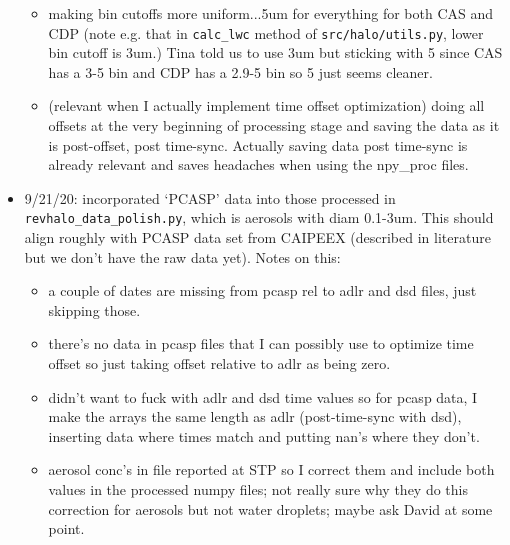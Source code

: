 \documentclass{article}
\begin{document}
\begin{itemize}
	\begin{itemize}
		\item making bin cutoffs more uniform...5um for everything for both CAS and CDP (note e.g. that in \texttt{calc\_lwc} method of \texttt{src/halo/utils.py}, lower bin cutoff is 3um.) Tina told us to use 3um but sticking with 5 since CAS has a 3-5 bin and CDP has a 2.9-5 bin so 5 just seems cleaner.
		\item (relevant when I actually implement time offset optimization) doing all offsets at the very beginning of processing stage and saving the data as it is post-offset, post time-sync. Actually saving data post time-sync is already relevant and saves headaches when using the npy\_proc files. 
	\end{itemize}
	\item 9/21/20: incorporated `PCASP' data into those processed in \texttt{revhalo\_data\_polish.py}, which is aerosols with diam 0.1-3um. This should align roughly with PCASP data set from CAIPEEX (described in literature but we don't have the raw data yet). Notes on this:
	\begin{itemize}
		\item a couple of dates are missing from pcasp rel to adlr and dsd files, just skipping those.
		\item there's no data in pcasp files that I can possibly use to optimize time offset so just taking offset relative to adlr as being zero. 
		\item didn't want to fuck with adlr and dsd time values so for pcasp data, I make the arrays the same length as adlr (post-time-sync with dsd), inserting data where times match and putting nan's where they don't.
		\item aerosol conc's in file reported at STP so I correct them and include both values in the processed numpy files; not really sure why they do this correction for aerosols but not water droplets; maybe ask David at some point.  
	\end{itemize}
\end{itemize}
\end{document}
